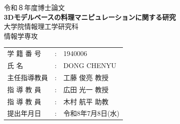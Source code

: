 
\usepackage{subcaption}



	\begin{titlepage}
		\begin{center}
			{\large 令和８年度博士論文} \\
			\vspace{2cm}
			{\LARGE \bf 3Dモデルベースの料理マニピュレーションに関する研究} \\
			
			\vspace{2cm}
			{\large 大学院情報理工学研究科 } \\
			{\large 情報学専攻} \\
			\vspace{3cm}
			\begin{tabular}{lcl}
				{\large 学 籍 番 号} &{\large :}	& {\large 1940006} \\ 
				{\large 氏 \hspace{11mm} 名}	&{\large :}& {\large DONG CHENYU} \\ 
				{\large 主任指導教員}			&{\large :}& {\large 工藤 俊亮 教授} \\ 
				{\large 指 導 教 員}			&{\large :}& {\large 広田 光一 教授} \\ 
				{\large 指 導 教 員}			&{\large :}& {\large 木村 航平 助教} \\ 
				{\large 提出年月日}			&{\large :}& {\large 令和8年7月8日(水)}
			\end{tabular}
		\end{center}
	\end{titlepage}
	
	\normalsize
	
	
	\tableofcontents
	\listoffigures
	\listoftables
	
	
	
	
	
	
	
	
	

    
	
    
    

